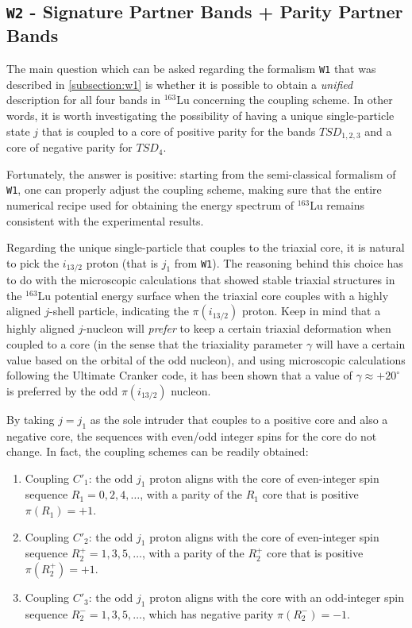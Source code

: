 \documentclass[myclassdoc,debug]{rjparticle}
\begin{document}
\subsection{\texttt{W2} - Signature Partner Bands + Parity Partner Bands}
\label{subsection:w2}

The main question which can be asked regarding the formalism \texttt{W1} that was described in \ref{subsection:w1} is whether it is possible to obtain a \emph{unified} description for all four bands in $^{163}$Lu concerning the coupling scheme. In other words, it is worth investigating the possibility of having a unique single-particle state $j$ that is coupled to a core of positive parity for the bands $TSD_{1,2,3}$ and a core of negative parity for $TSD_4$.

Fortunately, the answer is positive: starting from the semi-classical formalism of \texttt{W1}, one can properly adjust the coupling scheme, making sure that the entire numerical recipe used for obtaining the energy spectrum of $^{163}$Lu remains consistent with the experimental results.

Regarding the unique single-particle that couples to the triaxial core, it is natural to pick the $i_{13/2}$ proton (that is $j_1$ from \texttt{W1}). The reasoning behind this choice has to do with the microscopic calculations \cite{jensen2002wobbling,hagemann2003quantized,jensen2004coexisting} that showed stable triaxial structures in the $^{163}$Lu potential energy surface when the triaxial core couples with a highly aligned $j$-shell particle, indicating the $\pi(i_{13/2})$ proton. Keep in mind that a highly aligned $j$-nucleon will \emph{prefer} to keep a certain triaxial deformation when coupled to a core \cite{hamamoto1983intrinsic,hamamoto1987rotational,hamamoto2016interplay} (in the sense that the triaxiality parameter $\gamma$ will have a certain value based on the orbital of the odd nucleon), and using microscopic calculations following the Ultimate Cranker code, it has been shown that a value of $\gamma\approx+20^\circ$ is preferred by the odd $\pi(i_{13/2})$ nucleon.

By taking $j=j_1$ as the sole intruder that couples to a positive core and also a negative core, the sequences with even/odd integer spins for the core do not change. In fact, the coupling schemes can be readily obtained:

\begin{enumerate}
    \item Coupling $C'_1$: the odd $j_1$ proton aligns with the core of even-integer spin sequence $R_1=0,2,4,\dots$, with a parity of the $R_1$ core that is positive $\pi(R_1)=+1$.
    \item Coupling $C'_2$: the odd $j_1$ proton aligns with the core of even-integer spin sequence $R_2^+=1,3,5,\dots$, with a parity of the $R_2^+$ core that is positive $\pi(R_2^+)=+1$.
    \item Coupling $C'_3$: the odd $j_1$ proton aligns with the core with an odd-integer spin sequence $R_2^-=1,3,5,\dots$, which has negative parity $\pi(R_2^-)=-1$.
\end{enumerate}
\end{document}
